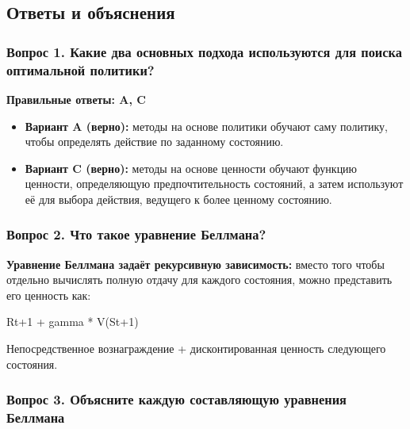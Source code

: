 \documentclass[11pt,a4paper]{article}
\begin{document}

\subsection{Ответы и объяснения}\label{answer-key-and-explanations}

\subsubsection{Вопрос 1. Какие два основных подхода используются для поиска оптимальной политики?}\label{q1-what-are-the-two-main-approaches-to-find-optimal-policy-1}

\textbf{Правильные ответы: A, C}

\begin{itemize}
\item
  \textbf{Вариант A (верно):} методы на основе политики обучают саму политику, чтобы определять действие по заданному состоянию.
\item
  \textbf{Вариант C (верно):} методы на основе ценности обучают функцию ценности, определяющую предпочтительность состояний, а затем используют её для выбора действия, ведущего к более ценному состоянию.
\end{itemize}

\subsubsection{Вопрос 2. Что такое уравнение Беллмана?}\label{q2-what-is-the-bellman-equation-1}

\textbf{Уравнение Беллмана задаёт рекурсивную зависимость:} вместо того чтобы отдельно вычислять полную отдачу для каждого состояния, можно представить его ценность как:

Rt+1 + gamma * V(St+1)

Непосредственное вознаграждение + дисконтированная ценность следующего состояния.

\subsubsection{Вопрос 3. Объясните каждую составляющую уравнения Беллмана}\label{q3-define-each-part-of-the-bellman-equation-1}

\end{document}
